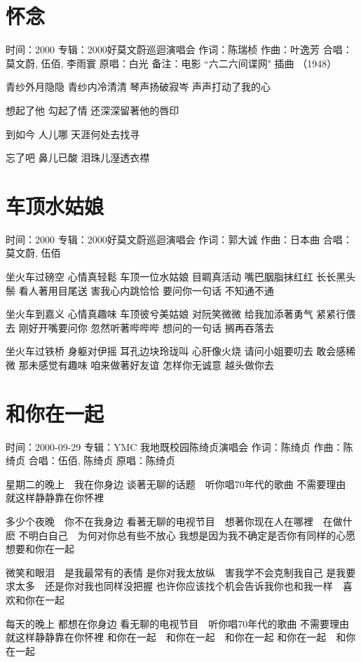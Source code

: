 \documentclass[UTF8,a4paper,oneside,twocolumn,12pt]{ctexbook}
\newcommand{\infopair}[2]{\textbullet #1：#2}
\newcommand{\zc}[1][伍佰]{\infopair{作词}{#1}}
\newcommand{\zq}[1][伍佰]{\infopair{作曲}{#1}}
\newcommand{\zj}[1]{\infopair{专辑}{#1}}
\newcommand{\yc}[1]{\infopair{原唱}{#1}}
\newcommand{\sj}[1]{\infopair{时间}{#1}}
\newcommand{\bz}[1]{\infopair{备注}{#1}}
\newenvironment{info}{\begin{flushleft}\kaishu
	}
	{\end{flushleft}\normalsize\yahei\par}
\newenvironment{lyric}{
	}
{}
\begin{document}
\section{怀念}
\begin{info}
	\sj{2000}
	\zj{2000好莫文蔚巡迴演唱会}
	\zc[陈瑞桢]
	\zq[叶逸芳]
	\infopair{合唱}{莫文蔚, 伍佰, 李雨寰}
	\yc{白光}
	\bz{电影 ``六二六间谍网" 插曲 （1948）}
\end{info}
\begin{lyric}
	青纱外月隐隐 青纱内冷清清
	琴声扬破寂岑 声声打动了我的心

	想起了他 勾起了情
	还深深留著他的唇印

	到如今 人儿哪
	天涯何处去找寻

	忘了吧 鼻儿已酸
	泪珠儿溼透衣襟
\end{lyric}

\section{车顶水姑娘}
\begin{info}
	\sj{2000}
	\zj{2000好莫文蔚巡迴演唱会}
	\zc[郭大诚]
	\zq[日本曲]
	\infopair{合唱}{莫文蔚, 伍佰}
\end{info}
\begin{lyric}
	坐火车过磅空 心情真轻鬆 车顶一位水姑娘 目睭真活动
	嘴巴胭脂抹红红 长长黑头鬃 看人著用目尾送 害我心内跳恰恰
	要问你一句话 不知通不通

	坐火车到嘉义 心情真趣味 车顶彼兮美姑娘 对阮笑微微
	给我加添著勇气 紧紧行偎去 刚好开嘴要问你 忽然听著哔哔哔
	想问的一句话 搁再吞落去

	坐火车过铁桥 身躯对伊摇 耳孔边块玲珑叫 心肝像火烧
	请问小姐要叨去 敢会感稀微 那未感觉有趣味 咱来做著好友谊
	怎样你无诚意 越头做你去
\end{lyric}

\section{和你在一起}
\begin{info}
	\sj{2000-09-29}
	\zj{YMC 我地既校园陈绮贞演唱会}
	\zc[陈绮贞]
	\zq[陈绮贞]
	\infopair{合唱}{伍佰, 陈绮贞}
	\yc{陈绮贞}
\end{info}
\begin{lyric}
	星期二的晚上　我在你身边
	谈著无聊的话题　听你唱70年代的歌曲
	不需要理由　就这样静静靠在你怀裡

	多少个夜晚　你不在我身边
	看著无聊的电视节目　想著你现在人在哪裡　在做什麽
	不明白自己　为何对你总有些不放心
	我想是因为我不确定是否你有同样的心愿　想要和你在一起

	微笑和眼泪　是我最常有的表情
	是你对我太放纵　害我学不会克制我自己
	是我要求太多　还是你对我也同样没把握
	也许你应该找个机会告诉我你也和我一样　喜欢和你在一起

	每天的晚上  都想在你身边
	看无聊的电视节目　听你唱70年代的歌曲
	不需要理由　就这样静静靠在你怀裡
	和你在一起　和你在一起　和你在一起
	和你在一起　和你在一起
\end{lyric}
\end{document}
